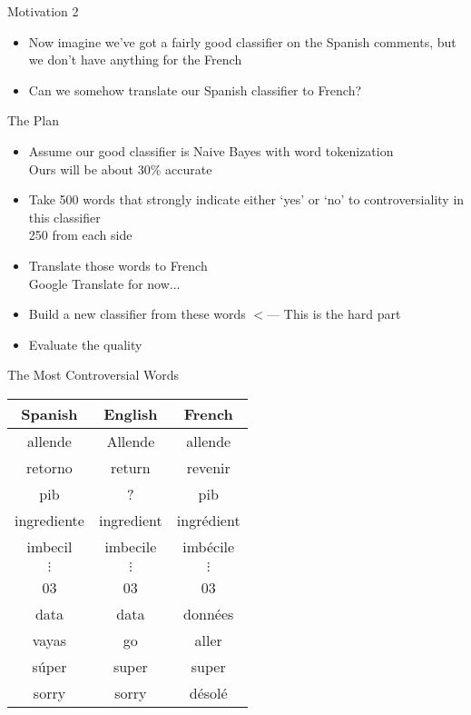 \documentclass{beamer}
\begin{document}
\begin{frame}{Motivation 2}
\begin{itemize}
\item Now imagine we've got a fairly good classifier on the Spanish comments, but we don't have anything for the French
\item Can we somehow translate our Spanish classifier to French?
\end{itemize}
\end{frame}

\begin{frame}{The Plan}
\begin{itemize}
\item Assume our good classifier is Naive Bayes with word tokenization \\
Ours will be about 30\% accurate
\item Take 500 words that strongly indicate either `yes' or `no' to controversiality in this classifier \\
250 from each side
\item Translate those words to French \\
Google Translate for now...
\item Build a new classifier from these words $<$--- This is the hard part
\item Evaluate the quality
\end{itemize}
\end{frame}

\begin{frame}{The Most Controversial Words}
\begin{center}
\begin{tabular}{|c|c|c|}
\rowcolor{gray!50}Spanish & English & French \\\hline
allende & Allende & allende \\
retorno & return & revenir \\
pib & ? & pib \\
ingrediente & ingredient & ingrédient \\
imbecil & imbecile & imbécile \\
$\vdots$ & $\vdots$ & $\vdots$ \\
03 & 03 & 03 \\
data & data & données \\
vayas & go & aller \\
súper & super & super \\
sorry & sorry & désolé \\
\end{tabular}
\end{center}
\end{frame}
\end{document}
